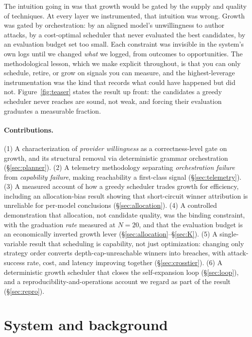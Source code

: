 \documentclass[letterpaper,twocolumn,10pt]{article}
\begin{document}
The intuition going in was that growth would be gated by the supply and quality of techniques. At every layer we instrumented, that intuition was wrong. Growth was gated by orchestration: by an aligned model's unwillingness to author attacks, by a cost-optimal scheduler that never evaluated the best candidates, by an evaluation budget set too small. Each constraint was invisible in the system's own logs until we changed \emph{what} we logged, from outcomes to opportunities. The methodological lesson, which we make explicit throughout, is that you can only schedule, retire, or grow on signals you can measure, and the highest-leverage instrumentation was the kind that records what could have happened but did not. Figure~\ref{fig:teaser} states the result up front: the candidates a greedy scheduler never reaches are sound, not weak, and forcing their evaluation graduates a measurable fraction.

\paragraph{Contributions.} (1) A characterization of \emph{provider willingness} as a correctness-level gate on growth, and its structural removal via deterministic grammar orchestration (\S\ref{sec:planner}). (2) A telemetry methodology separating \emph{orchestration failure} from \emph{capability failure}, making reachability a first-class signal (\S\ref{sec:telemetry}). (3) A measured account of how a greedy scheduler trades growth for efficiency, including an allocation-bias result showing that short-circuit winner attribution is unreliable for per-model conclusions (\S\ref{sec:allocation}). (4) A controlled demonstration that allocation, not candidate quality, was the binding constraint, with the graduation \emph{rate} measured at $N{=}20$, and that the evaluation budget is an economically inverted growth lever (\S\ref{sec:allocation}--\S\ref{sec:K}). (5) A single-variable result that scheduling is capability, not just optimization: changing only strategy order converts depth-cap-unreachable winners into breaches, with attack-success rate, cost, and latency improving together (\S\ref{sec:crosstier}). (6) A deterministic growth scheduler that closes the self-expansion loop (\S\ref{sec:loop}), and a reproducibility-and-operations account we regard as part of the result (\S\ref{sec:repro}).

\section{System and background}
\end{document}
